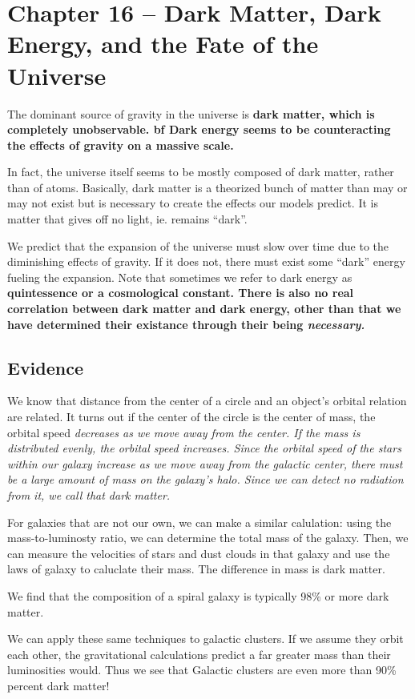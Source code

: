 \section{Chapter 16 -- Dark Matter, Dark Energy, and the Fate of the Universe}
The dominant source of gravity in the universe is \bf{dark matter}, which is completely unobservable. \bf{bf Dark energy} seems to be counteracting the effects of gravity on a massive scale.

In fact, the universe itself seems to be mostly composed of dark matter, rather than of atoms. Basically, dark matter is a theorized bunch of matter than may or may not exist but is necessary to create the effects our models predict. It is matter that gives off no light, ie. remains ``dark''.

We predict that the expansion of the universe must slow over time due to the diminishing effects of gravity. If it does not, there must exist some ``dark'' energy fueling the expansion. Note that sometimes we refer to dark energy as \bf{quintessence} or a \bf{cosmological constant}. There is also no real correlation between dark matter and dark energy, other than that we have determined their existance through their being \it{necessary}.

\subsection{Evidence}
We know that distance from the center of a circle and an object's orbital relation are related. It turns out if the center of the circle is the center of mass, the orbital speed \it{decreases} as we move away from the center. If the mass is distributed evenly, the orbital speed \it{increases}. Since the orbital speed of the stars within our galaxy increase as we move away from the galactic center, there must be a large amount of mass on the galaxy's halo. Since we can detect no radiation from it, we call that dark matter.

For galaxies that are not our own, we can make a similar calulation: using the mass-to-luminosty ratio, we can determine the total mass of the galaxy. Then, we can measure the velocities of stars and dust clouds in that galaxy and use the laws of galaxy to caluclate their mass. The difference in mass is dark matter.

We find that the composition of a spiral galaxy is typically 98\% or more dark matter.

We can apply these same techniques to galactic clusters. If we assume they orbit each other, the gravitational calculations predict a far greater mass than their luminosities would. Thus we see that Galactic clusters are even more than 90\% percent dark matter!

